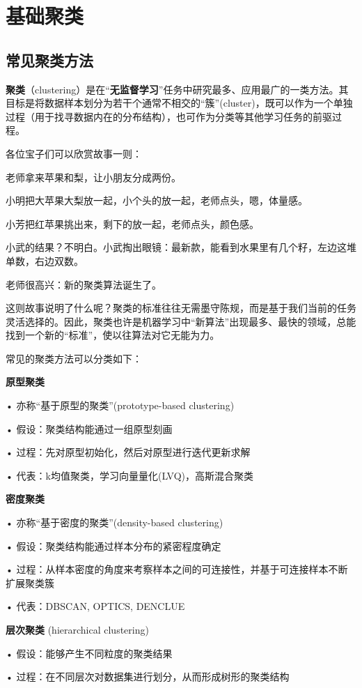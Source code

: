 \section{基础聚类}

\subsection{常见聚类方法}
\textbf{聚类}（clustering）是在“\textbf{无监督学习}”任务中研究最多、应用最广的一类方法。其目标是将数据样本划分为若干个通常不相交的“簇”(cluster)，既可以作为一个单独过程（用于找寻数据内在的分布结构），也可作为分类等其他学习任务的前驱过程。

各位宝子们可以欣赏故事一则：

老师拿来苹果和梨，让小朋友分成两份。

小明把大苹果大梨放一起，小个头的放一起，老师点头，嗯，体量感。

小芳把红苹果挑出来，剩下的放一起，老师点头，颜色感。

小武的结果？不明白。小武掏出眼镜：最新款，能看到水果里有几个籽，左边这堆单数，右边双数。

老师很高兴：新的聚类算法诞生了。

这则故事说明了什么呢？聚类的标准往往无需墨守陈规，而是基于我们当前的任务灵活选择的。因此，聚类也许是机器学习中“新算法”出现最多、最快的领域，总能找到一个新的“标准”，使以往算法对它无能为力。

常见的聚类方法可以分类如下：

  \textbf{原型聚类}

• 亦称“基于原型的聚类”(prototype-based clustering)

• 假设：聚类结构能通过一组原型刻画

• 过程：先对原型初始化，然后对原型进行迭代更新求解

• 代表：k均值聚类，学习向量量化(LVQ)，高斯混合聚类

  \textbf{密度聚类}

• 亦称“基于密度的聚类”(density-based clustering)

• 假设：聚类结构能通过样本分布的紧密程度确定

• 过程：从样本密度的角度来考察样本之间的可连接性，并基于可连接样本不断扩展聚类簇

• 代表：DBSCAN, OPTICS, DENCLUE

  \textbf{层次聚类} (hierarchical clustering)

• 假设：能够产生不同粒度的聚类结果

• 过程：在不同层次对数据集进行划分，从而形成树形的聚类结构

